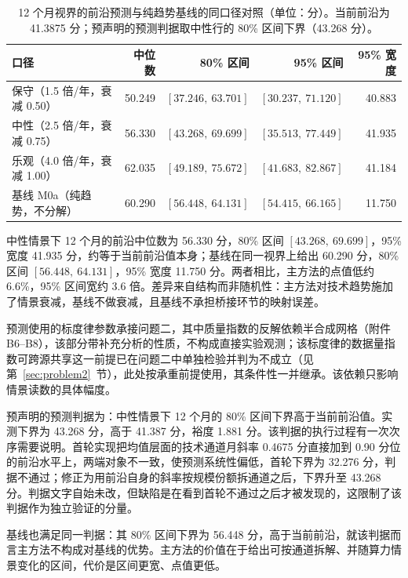 \begin{table}[H]
  \centering
  \caption{12 个月视界的前沿预测与纯趋势基线的同口径对照（单位：分）。当前前沿为 41.3875 分；预声明的预测判据取中性行的 80\% 区间下界（43.268 分）。}
  \label{tab:q4-forecast}
  \begin{tabular}{@{}lrrrr@{}}
    \toprule
    口径 & 中位数 & 80\% 区间 & 95\% 区间 & 95\% 宽度 \\
    \midrule
    保守（1.5 倍/年，衰减 0.50） & 50.249 & $[37.246,\ 63.701]$ & $[30.237,\ 71.120]$ & 40.883 \\
    中性（2.5 倍/年，衰减 0.75） & 56.330 & $[43.268,\ 69.699]$ & $[35.513,\ 77.449]$ & 41.935 \\
    乐观（4.0 倍/年，衰减 1.00） & 62.035 & $[49.189,\ 75.672]$ & $[41.683,\ 82.867]$ & 41.184 \\
    基线 M0a（纯趋势，不分解） & 60.290 & $[56.448,\ 64.131]$ & $[54.415,\ 66.165]$ & 11.750 \\
    \bottomrule
  \end{tabular}
\end{table}

中性情景下 12 个月的前沿中位数为 56.330 分，80\% 区间 $[43.268,\ 69.699]$，95\% 宽度 41.935 分，约等于当前前沿值本身；基线在同一视界上给出 60.290 分，80\% 区间 $[56.448,\ 64.131]$，95\% 宽度 11.750 分。两者相比，主方法的点值低约 6.6\%，95\% 区间宽约 3.6 倍。差异来自结构而非随机性：主方法对技术趋势施加了情景衰减，基线不做衰减，且基线不承担桥接环节的映射误差。

预测使用的标度律参数承接问题二，其中质量指数的反解依赖半合成网格（附件 B6--B8），该部分带补充分析的性质，不构成直接实验观测；该标度律的数据量指数可跨源共享这一前提已在问题二中单独检验并判为不成立（见第~\ref{sec:problem2}~节），此处按承重前提使用，其条件性一并继承。该依赖只影响情景读数的具体幅度。

预声明的预测判据为：中性情景下 12 个月的 80\% 区间下界高于当前前沿值。实测下界为 43.268 分，高于 41.387 分，裕度 1.881 分。该判据的执行过程有一次次序需要说明。首轮实现把均值层面的技术通道月斜率 0.4675 分直接加到 0.90 分位的前沿水平上，两端对象不一致，使预测系统性偏低，首轮下界为 32.276 分，判据不通过；修正为用前沿自身的斜率按规模份额拆通道之后，下界升至 43.268 分。判据文字自始未改，但缺陷是在看到首轮不通过之后才被发现的，这限制了该判据作为独立验证的分量。

基线也满足同一判据：其 80\% 区间下界为 56.448 分，高于当前前沿，就该判据而言主方法不构成对基线的优势。主方法的价值在于给出可按通道拆解、并随算力情景变化的区间，代价是区间更宽、点值更低。

